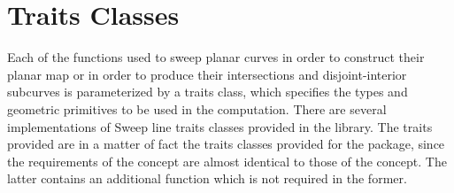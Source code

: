 
\section{Traits Classes}
Each of the functions used to sweep planar curves in order to construct 
their planar map or in order to produce their intersections and 
disjoint-interior subcurves 
is parameterized by a traits class, which specifies the types and geometric
primitives to be used in the computation. 
There are several implementations of Sweep line traits classes 
provided in the library. The traits provided are in a matter of fact the 
traits classes provided for the  package, since the requirements of the  
concept are almost identical to those of the 
 concept. 
The latter contains an additional function which is not required 
in the former.

%
